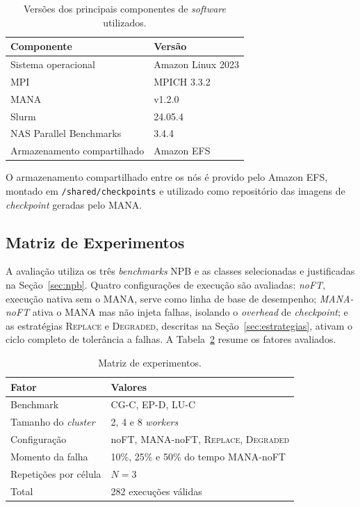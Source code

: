 \begin{table}[htb]
  \caption{Versões dos principais componentes de \textit{software} utilizados.}
  \label{tab:software}
  \centering
  \begin{tabular}{ll}
    \toprule
    Componente & Versão \\
    \midrule
    Sistema operacional & Amazon Linux 2023 \\
    MPI                 & MPICH 3.3.2 \\
    MANA                & v1.2.0 \\
    Slurm               & 24.05.4 \\
    NAS Parallel Benchmarks & 3.4.4 \\
    Armazenamento compartilhado & Amazon EFS \\
    \bottomrule
  \end{tabular}
\end{table}

O armazenamento compartilhado entre os nós é provido pelo Amazon EFS, montado em
\texttt{/shared/checkpoints} e utilizado como repositório das imagens de
\textit{checkpoint} geradas pelo MANA.

\subsection{Matriz de Experimentos}
\label{sec:matriz}

A avaliação utiliza os três \textit{benchmarks} NPB e as classes selecionadas e
justificadas na Seção~\ref{sec:npb}. Quatro configurações de execução são avaliadas:
\textit{noFT}, execução nativa sem o MANA, serve como linha de base de desempenho;
\textit{MANA-noFT} ativa o MANA mas não injeta falhas, isolando o \textit{overhead}
de \textit{checkpoint}; e as estratégias \textsc{Replace} e \textsc{Degraded}, descritas na
Seção~\ref{sec:estrategias}, ativam o ciclo completo de tolerância a falhas.
A Tabela~\ref{tab:matriz} resume os fatores avaliados.

\begin{table}[htb]
  \caption{Matriz de experimentos.}
  \label{tab:matriz}
  \centering
  \begin{tabular}{ll}
    \toprule
    Fator & Valores \\
    \midrule
    Benchmark             & CG-C, EP-D, LU-C \\
    Tamanho do \textit{cluster}    & 2, 4 e 8 \textit{workers} \\
    Configuração          & noFT, MANA-noFT, \textsc{Replace}, \textsc{Degraded} \\
    Momento da falha      & 10\%, 25\% e 50\% do tempo MANA-noFT \\
    Repetições por célula & $N = 3$ \\
    \midrule
    Total & 282 execuções válidas \\
    \bottomrule
  \end{tabular}
\end{table}

